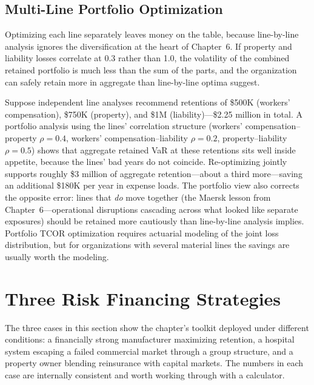 \documentclass[11pt,openany]{book}
\begin{document}
\subsection{Multi-Line Portfolio Optimization}
\label{subsec:multiline}

Optimizing each line separately leaves money on the table, because
line-by-line analysis ignores the diversification at the heart of
Chapter~6. If property and liability losses correlate
at 0.3 rather than 1.0, the volatility of the combined retained portfolio is
much less than the sum of the parts, and the organization can safely retain
more in aggregate than line-by-line optima suggest.

Suppose independent line analyses recommend retentions of \$500K (workers'
compensation), \$750K (property), and \$1M (liability)---\$2.25 million in
total. A portfolio analysis using the lines' correlation structure (workers'
compensation--property \(\rho = 0.4\), workers' compensation--liability
\(\rho = 0.2\), property--liability \(\rho = 0.5\)) shows that aggregate
retained VaR at these retentions sits well inside appetite, because the
lines' bad years do not coincide. Re-optimizing jointly supports roughly \$3
million of aggregate retention---about a third more---saving an additional
\$180K per year in expense loads. The portfolio view also corrects the
opposite error: lines that \emph{do} move together (the Maersk lesson from
Chapter~6---operational disruptions cascading across
what looked like separate exposures) should be retained more cautiously than
line-by-line analysis implies. Portfolio TCOR optimization requires actuarial
modeling of the joint loss distribution, but for organizations with several
material lines the savings are usually worth the modeling.

\section{Three Risk Financing Strategies}
\label{sec:cases}

The three cases in this section show the chapter's toolkit deployed under
different conditions: a financially strong manufacturer maximizing retention,
a hospital system escaping a failed commercial market through a group
structure, and a property owner blending reinsurance with capital markets.
The numbers in each case are internally consistent and worth working through
with a calculator.
\end{document}
